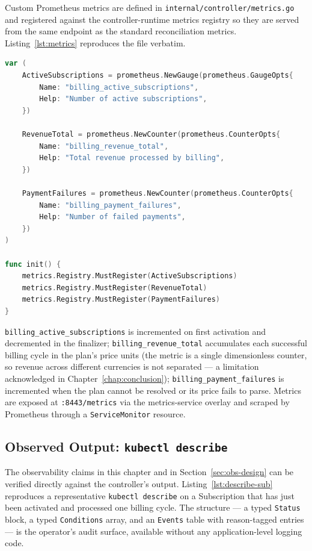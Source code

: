 Custom Prometheus metrics are defined in \texttt{internal/controller/metrics.go} and registered against the controller-runtime metrics registry so they are served from the same endpoint as the standard reconciliation metrics. Listing~\ref{lst:metrics} reproduces the file verbatim.

\begin{lstlisting}[language=Go, caption={Custom Prometheus metrics}, label={lst:metrics}]
var (
    ActiveSubscriptions = prometheus.NewGauge(prometheus.GaugeOpts{
        Name: "billing_active_subscriptions",
        Help: "Number of active subscriptions",
    })

    RevenueTotal = prometheus.NewCounter(prometheus.CounterOpts{
        Name: "billing_revenue_total",
        Help: "Total revenue processed by billing",
    })

    PaymentFailures = prometheus.NewCounter(prometheus.CounterOpts{
        Name: "billing_payment_failures",
        Help: "Number of failed payments",
    })
)

func init() {
    metrics.Registry.MustRegister(ActiveSubscriptions)
    metrics.Registry.MustRegister(RevenueTotal)
    metrics.Registry.MustRegister(PaymentFailures)
}
\end{lstlisting}

\texttt{billing\_active\_subscriptions} is incremented on first activation and decremented in the finalizer; \texttt{billing\_revenue\_total} accumulates each successful billing cycle in the plan's price units (the metric is a single dimensionless counter, so revenue across different currencies is not separated --- a limitation acknowledged in Chapter~\ref{chap:conclusion}); \texttt{billing\_payment\_failures} is incremented when the plan cannot be resolved or its price fails to parse. Metrics are exposed at \texttt{:8443/metrics} via the metrics-service overlay and scraped by Prometheus through a \texttt{ServiceMonitor} resource.

\subsection{Observed Output: \texttt{kubectl describe}}

The observability claims in this chapter and in Section~\ref{sec:obs-design} can be verified directly against the controller's output. Listing~\ref{lst:describe-sub} reproduces a representative \texttt{kubectl describe} on a Subscription that has just been activated and processed one billing cycle. The structure --- a typed \texttt{Status} block, a typed \texttt{Conditions} array, and an \texttt{Events} table with reason-tagged entries --- is the operator's audit surface, available without any application-level logging code.

